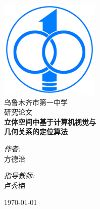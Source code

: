 ﻿\begin{titlepage}
\begin{center}
\includegraphics[scale=0.5]{./logo.png}\\[1cm] 
\textsc{\LARGE 乌鲁木齐市第一中学}\\[1.5cm]
\textsc{\Large 研究论文}\\[0.5cm]
{ \huge \bfseries 立体空间中基于计算机视觉与\\几何关系的定位算法}\\[5cm]


\begin{minipage}{0.4\textwidth}
\begin{flushleft} \large
\begin{center}
\emph{作者:}\\
方德治
\end{center}
\end{flushleft}
\end{minipage}
\begin{minipage}{0.4\textwidth}
\begin{flushright} \large
\begin{center}
\emph{指导教师:} \\
卢秀梅
\end{center}
\end{flushright}
\end{minipage}

\vfill

{\large \today}

\end{center}
\end{titlepage}
